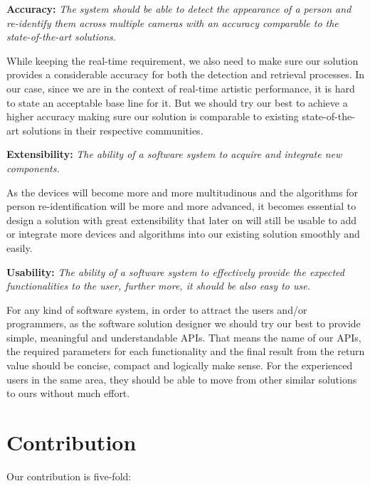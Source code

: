 \textbf{Accuracy:} 
\textit{The system should be able to detect the appearance of a person and 
re-identify them across multiple cameras with an accuracy comparable to the 
state-of-the-art solutions.}

While keeping the real-time requirement, we also need to make sure our solution
provides a considerable accuracy for both the detection and retrieval processes.
In our case, since we are in the context of real-time artistic performance, it
is hard to state an acceptable base line for it. But we should try our best to
achieve a higher accuracy making sure our solution is comparable to existing 
state-of-the-art solutions in their respective communities.

\textbf{Extensibility:}
\textit{The ability of a software system to acquire and integrate new
components.}

As the devices will become more and more multitudinous and the algorithms for
person re-identification will be more and more advanced, it becomes essential
to design a solution with great extensibility that later on will still
be usable to add or integrate more devices and algorithms into our existing
solution smoothly and easily.

\textbf{Usability:}
\textit{The ability of a software system to effectively provide the expected
functionalities to the user, further more, it should be also easy to use.}

For any kind of software system, in order to attract the users and/or 
programmers, as the software solution designer we should try our best to 
provide simple, meaningful and understandable APIs.
That means the name of our APIs, the required parameters for each functionality
and the final result from the return value should be concise, compact and
logically make sense. For the experienced users in the same area, they should
be able to move from other similar solutions to ours without much effort.

\section{Contribution}
\label{sec:intro-contrib}

Our contribution is five-fold:

